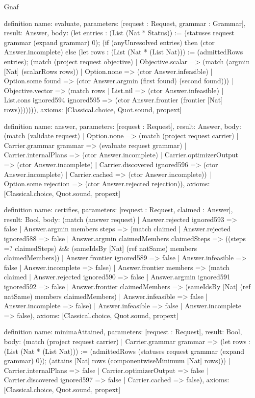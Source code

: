 \begin{lexlean}{Gnaf}
\begin{semanticmodule}
definition{
  name: evaluate,
  parameters: [request : Request, grammar : Grammar],
  result: Answer,
  body: (let entries : (List (Nat * Status)) := (statuses request grammar (expand grammar) 0); (if (anyUnresolved entries) then (ctor Answer.incomplete) else (let rows : (List (Nat * (List Nat))) := (admittedRows entries); (match (project request objective)
    | Objective.scalar => (match (argmin [Nat] (scalarRows rows))
      | Option.none => (ctor Answer.infeasible)
      | Option.some found => (ctor Answer.argmin (first found) (second found)))
    | Objective.vector => (match rows
      | List.nil => (ctor Answer.infeasible)
      | List.cons ignored594 ignored595 => (ctor Answer.frontier (frontier [Nat] rows))))))),
  axioms: [Classical.choice, Quot.sound, propext]
}

definition{
  name: answer,
  parameters: [request : Request],
  result: Answer,
  body: (match (validate request)
    | Option.none => (match (project request carrier)
      | Carrier.grammar grammar => (evaluate request grammar)
      | Carrier.internalPlans => (ctor Answer.incomplete)
      | Carrier.optimizerOutput => (ctor Answer.incomplete)
      | Carrier.discovered ignored596 => (ctor Answer.incomplete)
      | Carrier.cached => (ctor Answer.incomplete))
    | Option.some rejection => (ctor Answer.rejected rejection)),
  axioms: [Classical.choice, Quot.sound, propext]
}

definition{
  name: certifies,
  parameters: [request : Request, claimed : Answer],
  result: Bool,
  body: (match (answer request)
    | Answer.rejected ignored593 => false
    | Answer.argmin members steps => (match claimed
      | Answer.rejected ignored588 => false
      | Answer.argmin claimedMembers claimedSteps => ((steps =? claimedSteps) && (sameIdsBy [Nat] (ref natSame) members claimedMembers))
      | Answer.frontier ignored589 => false
      | Answer.infeasible => false
      | Answer.incomplete => false)
    | Answer.frontier members => (match claimed
      | Answer.rejected ignored590 => false
      | Answer.argmin ignored591 ignored592 => false
      | Answer.frontier claimedMembers => (sameIdsBy [Nat] (ref natSame) members claimedMembers)
      | Answer.infeasible => false
      | Answer.incomplete => false)
    | Answer.infeasible => false
    | Answer.incomplete => false),
  axioms: [Classical.choice, Quot.sound, propext]
}

definition{
  name: minimaAttained,
  parameters: [request : Request],
  result: Bool,
  body: (match (project request carrier)
    | Carrier.grammar grammar => (let rows : (List (Nat * (List Nat))) := (admittedRows (statuses request grammar (expand grammar) 0)); (attains [Nat] rows (componentwiseMinimum [Nat] rows)))
    | Carrier.internalPlans => false
    | Carrier.optimizerOutput => false
    | Carrier.discovered ignored597 => false
    | Carrier.cached => false),
  axioms: [Classical.choice, Quot.sound, propext]
}


\end{semanticmodule}
\end{lexlean}
